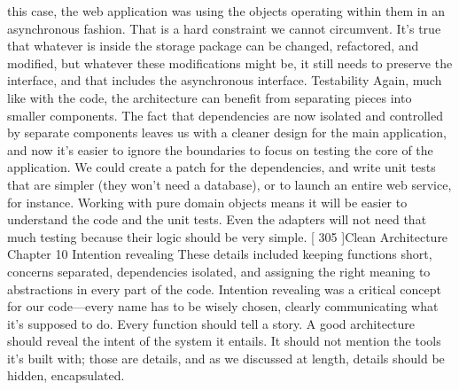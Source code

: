 \documentclass[a4paper,10pt,english]{sphinxmanual}
\begin{document}
this case, the web application was using the objects operating within them in an
asynchronous fashion. That is a hard constraint we cannot circumvent. It’s true that
whatever is inside the storage package can be changed, refactored, and modified, but
whatever these modifications might be, it still needs to preserve the interface, and that
includes the asynchronous interface.
Testability
Again, much like with the code, the architecture can benefit from separating pieces into
smaller components. The fact that dependencies are now isolated and controlled by
separate components leaves us with a cleaner design for the main application, and now it’s
easier to ignore the boundaries to focus on testing the core of the application.
We could create a patch for the dependencies, and write unit tests that are simpler (they
won’t need a database), or to launch an entire web service, for instance. Working with pure
domain objects means it will be easier to understand the code and the unit tests. Even the
adapters will not need that much testing because their logic should be very simple.
{[} 305 {]}Clean Architecture
Chapter 10
Intention revealing
These details included keeping functions short, concerns separated, dependencies isolated,
and assigning the right meaning to abstractions in every part of the code. Intention
revealing was a critical concept for our code—every name has to be wisely chosen, clearly
communicating what it’s supposed to do. Every function should tell a story.
A good architecture should reveal the intent of the system it entails. It should not mention
the tools it’s built with; those are details, and as we discussed at length, details should be
hidden, encapsulated.



\renewcommand{\indexname}{Index}
\printindex
\end{document}
